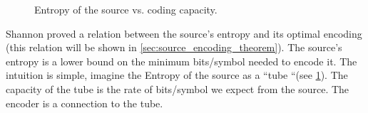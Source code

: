 

\begin{figure}[hbt!]
	\centering {}
\caption{Entropy of the source vs. coding capacity.}\label{fig:tube}
\end{figure}
Shannon proved a relation between the source's entropy and its optimal encoding (this relation will be shown in \cref{sec:source_encoding_theorem}). The source's entropy is a lower bound on the minimum bits/symbol needed to encode it. The intuition is simple, imagine the Entropy of the source as a ``tube ``(see \cref{fig:tube}). The capacity of the tube is the rate of bits/symbol we expect from the source. The encoder is a connection to the tube.


